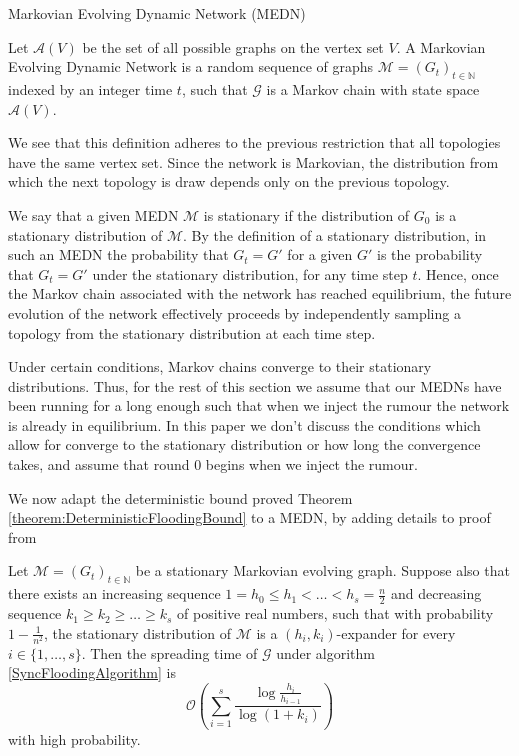 \label{subsection:MEDNBound}

\begin{definition}
	Markovian Evolving Dynamic Network (MEDN)

	\noindent 
	Let $\mathcal{A}(V)$ be the set of all possible graphs on the vertex set $V$.
	A Markovian Evolving Dynamic Network is a random sequence of graphs $\mathcal{M} = (G_t)_{t \in \mathbb{N}}$ indexed by an integer time $t$, such that $\mathcal{G}$ is a Markov chain with state space $\mathcal{A}(V)$.
\end{definition}

We see that this definition adheres to the previous restriction that all topologies have the same vertex set. Since the network is Markovian, the distribution from which the next topology is draw depends only on the previous topology.

We say that a given MEDN $\mathcal{M}$ is stationary if the distribution of $G_0$ is a stationary distribution of $\mathcal{M}$. By the definition of a stationary distribution, in such an MEDN the probability that $G_t = G'$ for a given $G'$ is the probability that $G_t = G'$ under the stationary distribution, for any time step $t$. Hence, once the Markov chain associated with the network has reached equilibrium, %
the future evolution of the network effectively proceeds by independently sampling a topology from the stationary distribution at each time step. %

Under certain conditions, Markov chains converge to their stationary distributions. Thus, for the rest of this section we assume that our MEDNs have been running for a long enough such that when we inject the rumour the network is already in equilibrium. In this paper we don't discuss the conditions which allow for converge to the stationary distribution or how long the convergence takes, and assume that round 0 begins when we inject the rumour.

We now adapt the deterministic bound proved Theorem \ref{theorem:DeterministicFloodingBound} to a MEDN, by adding details to proof from \cite{syncPaper}


\begin{theorem}
	Let $\mathcal{M} = (G_t)_{t \in \mathbb{N}}$  be a stationary Markovian evolving graph. Suppose also that there exists an increasing sequence $1 = h_0 \leq h_1 < \dots < h_s = \frac{n}{2}$ and decreasing sequence $k_1 \geq k_2 \geq \dots \geq k_s$ of positive real numbers, such that with probability $1-\frac{1}{n^2}$, the stationary distribution of $\mathcal{M}$ is a $(h_i, k_i)$-expander for every $i \in \{1, \dots , s\}$. Then the spreading time of $\mathcal{G}$ under algorithm \ref{SyncFloodingAlgorithm} is
	$$
		\mathcal{O}\left(\sum_{i=1}^s \frac{\log \frac{h_i}{h_{i-1}}}{\log(1+k_i)}\right)
	$$
	with high probability.
\end{theorem}

